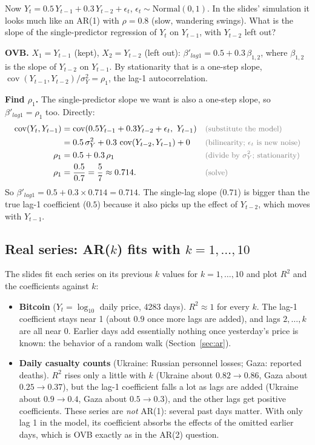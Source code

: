 \documentclass[11pt]{article}
\newcommand{\Cov}{\operatorname{cov}}
\newcommand{\Norm}{\text{Normal}}
\newcommand{\why}[1]{&&\text{\small\color{gray}(#1)}}
\begin{document}
\begin{examplebox}[title={Question (10/19): an AR(2) process fit with one lag}]
Now $Y_t=0.5\,Y_{t-1}+0.3\,Y_{t-2}+\epsilon_t$, $\epsilon_t\sim\Norm(0,1)$. In the slides' simulation it looks much like an AR(1) with $\rho=0.8$
(slow, wandering swings). What is the slope of the single-predictor regression of $Y_t$ on $Y_{t-1}$, with $Y_{t-2}$ left out?

\textbf{OVB.} $X_1=Y_{t-1}$ (kept), $X_2=Y_{t-2}$ (left out):
$\beta'_{lag1}=0.5+0.3\,\beta_{1,2}$, where $\beta_{1,2}$ is the slope of $Y_{t-2}$ on $Y_{t-1}$. By stationarity that is a one-step slope,
$\Cov(Y_{t-1},Y_{t-2})/\sigma_Y^2=\rho_1$, the lag-1 autocorrelation.

\textbf{Find $\rho_1$.} The single-predictor slope we want is also a one-step slope, so $\beta'_{lag1}=\rho_1$ too. Directly:
\begin{align*}
\Cov(Y_t,Y_{t-1})&=\Cov(0.5Y_{t-1}+0.3Y_{t-2}+\epsilon_t,\ Y_{t-1}) \why{substitute the model}\\
&=0.5\,\sigma_Y^2+0.3\,\Cov(Y_{t-2},Y_{t-1})+0 \why{bilinearity; $\epsilon_t$ is new noise}\\
\rho_1&=0.5+0.3\,\rho_1 \why{divide by $\sigma_Y^2$; stationarity}\\
\rho_1&=\frac{0.5}{0.7}=\frac57\approx0.714. \why{solve}
\end{align*}
So $\beta'_{lag1}=0.5+0.3\times0.714=0.714$. The single-lag slope ($0.71$) is bigger than the true lag-1 coefficient ($0.5$) because it also
picks up the effect of $Y_{t-2}$, which moves with $Y_{t-1}$.
\end{examplebox}

\subsection{Real series: AR($k$) fits with $k=1,\dots,10$}
The slides fit each series on its previous $k$ values for $k=1,\dots,10$ and plot $R^2$ and the coefficients against $k$:
\begin{itemize}[leftmargin=*,itemsep=2pt]
\item \textbf{Bitcoin} ($Y_t=\log_{10}$ daily price, 4283 days). $R^2\approx1$ for every $k$. The lag-1 coefficient stays near 1 (about $0.9$
once more lags are added), and lags $2,\dots,k$ are all near 0. Earlier days add essentially nothing once yesterday's price is known: the
behavior of a random walk (Section~\ref{sec:ar}).
\item \textbf{Daily casualty counts} (Ukraine: Russian personnel losses; Gaza: reported deaths). $R^2$ rises only a little with $k$
(Ukraine about $0.82\to0.86$, Gaza about $0.25\to0.37$), but the lag-1 coefficient falls a lot as lags are added (Ukraine about $0.9\to0.4$,
Gaza about $0.5\to0.3$), and the other lags get positive coefficients. These series are \emph{not} AR(1): several past days matter. With only
lag 1 in the model, its coefficient absorbs the effects of the omitted earlier days, which is OVB exactly as in the AR(2) question.
\end{itemize}
\end{document}
